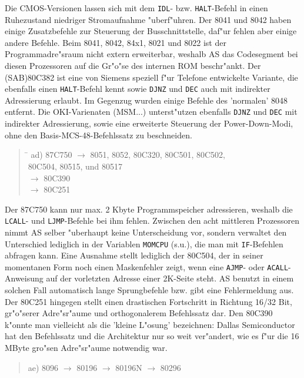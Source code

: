 \documentclass[12pt,a4paper,twoside]{report}
\newcommand{\tty}[1]{{\tt #1}}
\begin{document}
Die CMOS-Versionen lassen
sich mit dem \tty{IDL}- bzw. \tty{HALT}-Befehl in einen Ruhezustand niedriger
Stromaufnahme "uberf"uhren.  Der 8041 und 8042 haben einige Zusatzbefehle zur
Steuerung der Busschnittstelle, daf"ur fehlen aber einige andere Befehle.
Beim 8041, 8042, 84x1, 8021 und 8022 ist der Programmadre"sraum nicht
extern erweiterbar, weshalb AS das Codesegment bei diesen Prozessoren
auf die Gr"o"se des internen ROM beschr"ankt.  Der (SAB)80C382 ist eine von
Siemens speziell f"ur Telefone entwickelte Variante, die ebenfalls
einen \tty{HALT}-Befehl kennt sowie \tty{DJNZ} und \tty{DEC} auch
mit indirekter Adressierung erlaubt.  Im Gegenzug wurden einige
Befehle des 'normalen' 8048 entfernt. Die OKI-Varienaten (MSM...)
unterst"utzen ebenfalls \tty{DJNZ} und \tty{DEC} mit indirekter
Adressierung, sowie eine erweiterte Steuerung der
Power-Down-Modi, ohne den Basis-MCS-48-Befehlssatz zu
beschneiden.
\begin{quote}
\begin{tabbing}
\hspace{0.7cm} \= \kill
ad) \> 87C750 $\rightarrow$ 8051, 8052, 80C320, 80C501, 80C502, \\
    \> 80C504, 80515, und 80517 \\
    \> $\rightarrow$ 80C390 \\
    \> $\rightarrow$ 80C251
\end{tabbing}
\end{quote}
Der 87C750 kann nur max. 2 Kbyte Programmspeicher adressieren, weshalb
die \tty{LCALL}- und \tty{LJMP}-Befehle bei ihm fehlen.  Zwischen den
acht mittleren Prozessoren nimmt AS selber "uberhaupt keine Unterscheidung
vor, sondern verwaltet den Unterschied lediglich in der Variablen
\tty{MOMCPU} (s.u.), die man mit \tty{IF}-Befehlen abfragen kann.  Eine
Ausnahme stellt lediglich der 80C504, der in seiner momentanen Form noch einen
Maskenfehler zeigt, wenn eine \tty{AJMP}- oder \tty{ACALL}-Anweisung auf der
vorletzten Adresse einer 2K-Seite steht.  AS benutzt in einem solchen
Fall automatisch lange Sprungbefehle bzw. gibt eine Fehlermeldung aus.  Der
80C251 hingegen stellt einen drastischen Fortschritt in Richtung 16/32 Bit,
gr"o"serer Adre"sr"aume und orthogonalerem Befehlssatz dar.  Den 80C390
k"onnte man vielleicht als die 'kleine L"osung' bezeichnen:  Dallas
Semiconductor hat den Befehlssatz und die Architektur nur so weit
ver"andert, wie es f"ur die 16 MByte gro"sen Adre"sr"aume notwendig war.
\begin{quote}
ae) 8096 $\rightarrow$ 80196 $\rightarrow$ 80196N $\rightarrow$ 80296
\end{quote}
\end{document}
